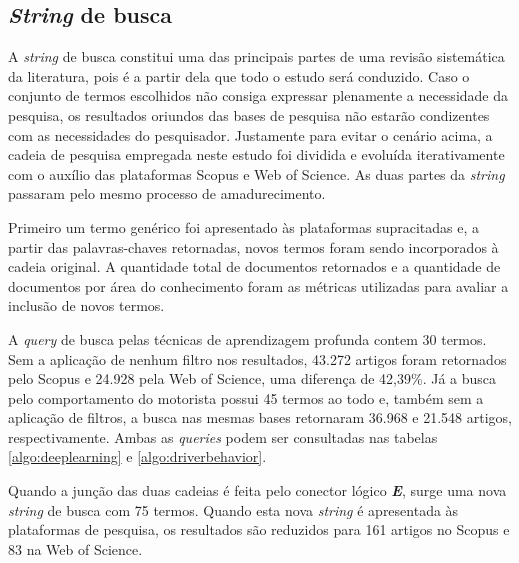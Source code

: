 \documentclass[10pt,journal,compsoc]{IEEEtran}
\begin{document}
\subsection{\textit{String} de busca}
\label{sec:protocolo:string}
A \textit{string} de busca constitui uma das principais partes de uma
revisão sistemática da literatura, pois é a partir dela que todo o
estudo será conduzido. Caso o conjunto de termos escolhidos não
consiga expressar plenamente a necessidade da pesquisa, os resultados
oriundos das bases de pesquisa não estarão condizentes com as necessidades do
pesquisador. Justamente para evitar o cenário acima, a cadeia de pesquisa
empregada neste estudo foi dividida e evoluída iterativamente com o
auxílio das plataformas Scopus e Web of Science. As duas partes da
\textit{string} passaram pelo mesmo processo de amadurecimento.

Primeiro um termo genérico foi apresentado às plataformas
supracitadas e, a partir das palavras-chaves retornadas, novos termos
foram sendo incorporados à cadeia original. A quantidade total de documentos
retornados e a quantidade de documentos por área do conhecimento foram
as métricas utilizadas para avaliar a inclusão de novos
termos.

A \textit{query} de busca pelas técnicas de aprendizagem profunda
contem 30 termos. Sem a aplicação de nenhum filtro nos resultados, 43.272 artigos foram
retornados pelo Scopus e 24.928 pela Web of Science, uma diferença de
42,39\%. Já a busca pelo comportamento do motorista possui 45
termos ao todo e, também sem a aplicação de filtros, a busca nas
mesmas bases retornaram 36.968 e 21.548 artigos, respectivamente. Ambas as \textit{queries} podem ser
consultadas nas tabelas \ref{algo:deeplearning} e
\ref{algo:driverbehavior}.

Quando a junção das duas cadeias é feita pelo conector lógico
\emph{\textbf{E}}, surge uma nova \textit{string} de busca com 75 termos. Quando esta nova
\textit{string} é apresentada às plataformas de pesquisa, os
resultados são reduzidos para 161 artigos no Scopus e 83 na Web of
Science.
\end{document}
